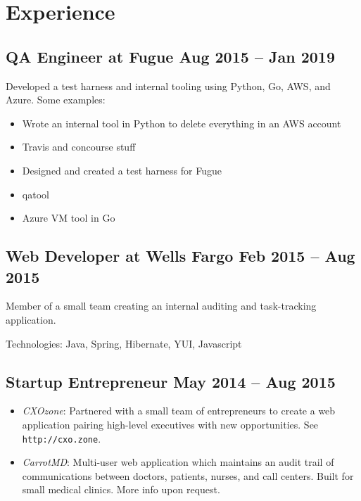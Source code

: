 \documentclass[12pt]{article}
\begin{document}

\section*{Experience}

\subsection*{QA Engineer at Fugue \hfill Aug 2015 -- Jan 2019}

Developed a test harness and internal tooling using Python, Go, AWS, and Azure.
Some examples:

\begin{itemize}
\item Wrote an internal tool in Python to delete everything in an AWS account
\item Travis and concourse stuff
\item Designed and created a test harness for Fugue
\item qatool
\item Azure VM tool in Go
\end{itemize}

\subsection*{Web Developer at Wells Fargo \hfill Feb 2015 -- Aug 2015}

Member of a small team creating an internal auditing and task-tracking
application.

Technologies: Java, Spring, Hibernate, YUI, Javascript

\subsection*{Startup Entrepreneur \hfill May 2014 -- Aug 2015}

\begin{itemize}
  \item \textit{CXOzone}: Partnered with a small team of entrepreneurs to create
    a web application pairing high-level executives with new opportunities. See
    \texttt{http://cxo.zone}.

  \item \textit{CarrotMD}: Multi-user web application which maintains an audit
    trail of communications between doctors, patients, nurses, and call centers.
    Built for small medical clinics. More info upon request.
\end{itemize}
\end{document}
